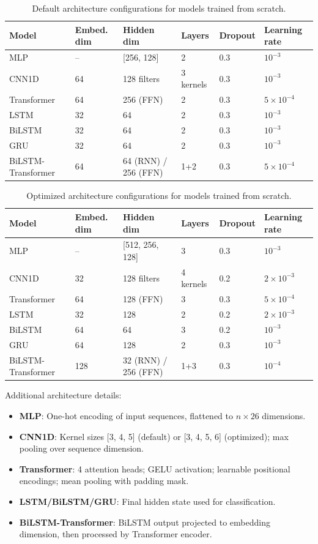 \begin{table}[h]
\centering
\caption{Default architecture configurations for models trained from scratch.}
\label{tab:dl_default_config}
\begin{tabular}{llllll}
\toprule
Model & Embed. dim & Hidden dim & Layers & Dropout & Learning rate \\
\midrule
MLP & -- & [256, 128] & 2 & 0.3 & $10^{-3}$ \\
CNN1D & 64 & 128 filters & 3 kernels & 0.3 & $10^{-3}$ \\
Transformer & 64 & 256 (FFN) & 2 & 0.3 & $5 \times 10^{-4}$ \\
LSTM & 32 & 64 & 2 & 0.3 & $10^{-3}$ \\
BiLSTM & 32 & 64 & 2 & 0.3 & $10^{-3}$ \\
GRU & 32 & 64 & 2 & 0.3 & $10^{-3}$ \\
BiLSTM-Transformer & 64 & 64 (RNN) / 256 (FFN) & 1+2 & 0.3 & $5 \times 10^{-4}$ \\
\bottomrule
\end{tabular}
\end{table}

\begin{table}[h]
\centering
\caption{Optimized architecture configurations for models trained from scratch.}
\label{tab:dl_optimal_config}
\begin{tabular}{llllll}
\toprule
Model & Embed. dim & Hidden dim & Layers & Dropout & Learning rate \\
\midrule
MLP & -- & [512, 256, 128] & 3 & 0.3 & $10^{-3}$ \\
CNN1D & 32 & 128 filters & 4 kernels & 0.2 & $2 \times 10^{-3}$ \\
Transformer & 64 & 128 (FFN) & 3 & 0.3 & $5 \times 10^{-4}$ \\
LSTM & 32 & 128 & 2 & 0.2 & $2 \times 10^{-3}$ \\
BiLSTM & 64 & 64 & 3 & 0.2 & $10^{-3}$ \\
GRU & 64 & 128 & 2 & 0.3 & $10^{-3}$ \\
BiLSTM-Transformer & 128 & 32 (RNN) / 256 (FFN) & 1+3 & 0.3 & $10^{-4}$ \\
\bottomrule
\end{tabular}
\end{table}

Additional architecture details:
\begin{itemize}
    \item \textbf{MLP}: One-hot encoding of input sequences, flattened to $n \times 26$ dimensions.
    \item \textbf{CNN1D}: Kernel sizes [3, 4, 5] (default) or [3, 4, 5, 6] (optimized); max pooling over sequence dimension.
    \item \textbf{Transformer}: 4 attention heads; GELU activation; learnable positional encodings; mean pooling with padding mask.
    \item \textbf{LSTM/BiLSTM/GRU}: Final hidden state used for classification.
    \item \textbf{BiLSTM-Transformer}: BiLSTM output projected to embedding dimension, then processed by Transformer encoder.
\end{itemize}


